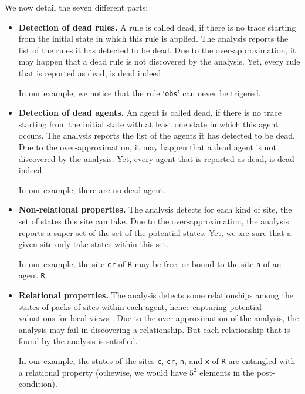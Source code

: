 \documentclass[11pt]{book}
\begin{document}
We now detail the seven different parts:
\begin{itemize}
\item \textbf{Detection of dead rules.} A rule is called dead, if there is no trace starting from the initial state in which this rule is applied. The analysis reports the list of the rules it has detected to be dead. Due to the over-approximation, it may happen that a dead rule is not discovered by the analysis. Yet, every rule that is reported as dead, is dead indeed.

In our example, we notice that the rule `\texttt{obs}' can never be trigered.

\item \textbf{Detection of dead agents.} An agent is called dead, if there is no trace starting from the initial state with at least one state in which this agent occurs. The analysis reports the list of the agents it has detected to be dead. Due to the over-approximation, it may happen that a dead agent is not discovered by the analysis. Yet, every agent that is reported as dead, is dead indeed.

In our example, there are no dead agent.

\item \textbf{Non-relational properties.} The analysis detects for each kind of site, the set of states this site can take.
Due to the over-approximation, the analysis reports a super-set of the set of the potential states. Yet, we are sure that a given site only take states within this set.

In our example, the site \texttt{cr} of \texttt{R} may be free, or bound to the site \texttt{n} of an agent \texttt{R}.

\item \textbf{Relational properties.} The analysis detects some relationships among the states of packs of sites within each agent, hence capturing potential valuations for local views \cite{Feret-ICCMSE2007,DanosEtAl-VMCAI08}.
Due to the over-approximation of the analysis, the analysis may fail in discovering a relationship. But each relationship that is found by the analysis is satisfied.

In our example, the states of the sites \texttt{c}, \texttt{cr}, \texttt{n}, and \texttt{x} of \texttt{R} are entangled with a relational property (othewise, we would have $5^2$ elements in the post-condition).



\end{itemize}
\end{document}
